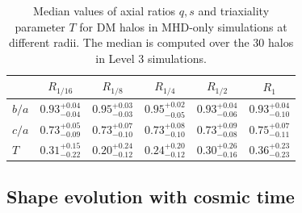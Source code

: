 \documentclass[a4paper,fleqn,usenatbib]{mnras}
\begin{document}
\begin{table}
\setlength{\tabcolsep}{3pt}
\begin{center}
\begin{tabular}{l|ccccc}
 &$R_{1/16}$& $R_{1/8}$& $R_{1/4}$& $R_{1/2}$& $R_1$\\
\hline 
$b/a$ &$0.93^{+0.04}_{-0.04}$&$0.95^{+0.03}_{-0.03}$&$0.95^{+0.02}_{-0.05}$&$0.93^{+0.04}_{-0.06}$&$0.93^{+0.04}_{-0.10}$\\[0.1cm]
$c/a$ &$0.73^{+0.05}_{-0.09}$&$0.73^{+0.07}_{-0.10}$&$0.73^{+0.08}_{-0.10}$&$0.73^{+0.09}_{-0.08}$&$0.75^{+0.07}_{-0.11}$\\[0.1cm] 
$T$ &$0.31^{+0.15}_{-0.22}$&$0.20^{+0.24}_{-0.12}$&$0.24^{+0.20}_{-0.12}$&$0.30^{+0.26}_{-0.16}$&$0.36^{+0.23}_{-0.23}$\\[0.1cm] 
\end{tabular}
\end{center}
\caption{Median values of axial ratios $q,s$ and triaxiality parameter
  $T$ for DM halos in MHD-only simulations at different radii. The
  median is computed over the 30 halos in Level 3 simulations.}  
\label{table:median_axial_ratio_MHD}
\end{table}



\subsection{Shape evolution with cosmic time}
\end{document}
